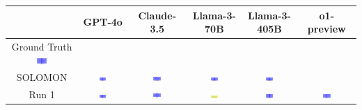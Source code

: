\begin{table}[H]
    \centering
    \begin{tabular}{|c|c|c|c|c|c|}
    \hline
    & GPT-4o & Claude-3.5 & Llama-3-70B & Llama-3-405B & o1-preview \\
    \hline
    Ground Truth {\includegraphics[width=0.15\textwidth]{examples_png/BasicLayout.png}} & & & & &  \\
    \hline
    SOLOMON & \includegraphics[width=0.15\textwidth]{./pool_all/png/gpt-4o_results/BasicLayout.png} & \includegraphics[width=0.15\textwidth]{./pool_all/png/claude-3-5-sonnet-20240620_results/BasicLayout.png} & \includegraphics[width=0.15\textwidth]{./pool_all/png/watsonx_meta-llama_llama-3-1-70b-instruct_results/BasicLayout.png} & \includegraphics[width=0.15\textwidth]{./pool_all/png/watsonx_meta-llama_llama-3-405b-instruct_results/BasicLayout.png} & \\
    \hline
    Run 1 & \includegraphics[width=0.15\textwidth]{./run_1/png/gpt-4o_results/BasicLayout.png} & \includegraphics[width=0.15\textwidth]{./run_1/png/claude-3-5-sonnet-20240620_results/BasicLayout.png} & \includegraphics[width=0.15\textwidth]{./run_1/png/watsonx_meta-llama_llama-3-1-70b-instruct_results/BasicLayout.png} & \includegraphics[width=0.15\textwidth]{./run_1/png/watsonx_meta-llama_llama-3-405b-instruct_results/BasicLayout.png} & \includegraphics[width=0.15\textwidth]{./run_1/png/o1-preview_results/BasicLayout.png} \\

\end{tabular}
\end{table}
